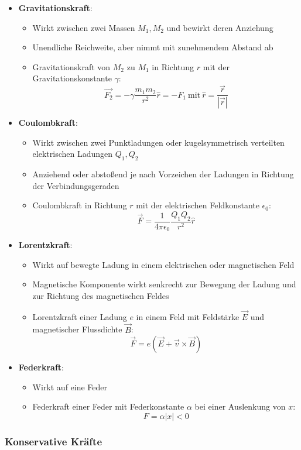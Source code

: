 \begin{itemize}
	\item \textbf{Gravitationskraft}:
	\begin{itemize}
		\item Wirkt zwischen zwei Massen $M_1, M_2$ und bewirkt deren Anziehung
		\item Unendliche Reichweite, aber nimmt mit zunehmendem Abstand ab
		\item Gravitationskraft von $M_2$ zu $M_1$ in Richtung $r$ mit der Gravitationskonstante $\gamma$: $$\vec{F_2} = -\gamma\frac{m_1m_2}{r^2}\hat{r} = -F_1\ \text{mit}\ \hat{r} = \frac{\vec{r}}{|\vec{r}|}$$
	\end{itemize}
	\item \textbf{Coulombkraft}:
	\begin{itemize}
		\item Wirkt zwischen zwei Punktladungen oder kugelsymmetrisch verteilten elektrischen Ladungen $Q_1, Q_2$
		\item Anziehend oder abstoßend je nach Vorzeichen der Ladungen in Richtung der Verbindungsgeraden
		\item Coulombkraft in Richtung $r$ mit der elektrischen Feldkonstante $\epsilon_0$: $$\vec{F} = \frac{1}{4\pi\epsilon_0}\frac{Q_1Q_2}{r^2}\hat{r}$$
	\end{itemize}
	\newpage
	\item \textbf{Lorentzkraft}:
	\begin{itemize}
		\item Wirkt auf bewegte Ladung in einem elektrischen oder magnetischen Feld
		\item Magnetische Komponente wirkt senkrecht zur Bewegung der Ladung und zur Richtung des magnetischen Feldes
		\item Lorentzkraft einer Ladung $e$ in einem Feld mit Feldstärke $\vec{E}$ und magnetischer Flussdichte $\vec{B}$: $$\vec{F} = e(\vec{E} + \vec{v} \times \vec{B})$$
	\end{itemize}
	\item \textbf{Federkraft}:
	\begin{itemize}
		\item Wirkt auf eine Feder
		\item Federkraft einer Feder mit Federkonstante $\alpha$ bei einer Auslenkung von $x$: $$F = \alpha|x| < 0$$
	\end{itemize}
\end{itemize}

\subsubsection{Konservative Kräfte}%
\label{newt:ssub:konservative_kraefte}

